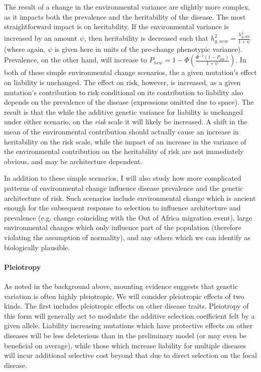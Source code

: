 \documentclass[11pt]{article}
\begin{document}
The result of a change in the environmental variance are slightly more complex, as it impacts both the prevalence and the heritability of the disease. The most straightforward impact is on heritability. If the environmental variance is increased by an amount $\psi$, then heritability is decreased such that $h^2_{g,new} = \frac{h^2_{g,old}}{1+\psi}$ (where again, $\psi$ is given here in units of the pre-change phenotypic variance). Prevalence, on the other hand, will increase to $P_{new} = 1 - \Phi\left(\frac{\Phi^{-1}\left(1-P_{old}\right)}{1+\psi}\right)$.
In both of these simple environmental change scenarios, the a given mutation's effect on liability is unchanged. The effect on risk, however, is increased, as a given mutation's contribution to risk conditional on its contribution to liability also depends on the prevalence of the disease (expressions omitted due to space). The result is that the while the additive genetic variance for liability is unchanged under either scenario, on the \textit{risk} scale it will likely be increased. A shift in the mean of the environmental contribution should actually cause an increase in heritability on the risk scale, while the impact of an increase in the variance of the environmental contribution on the heritability of risk are not immediately obvious, and may be architecture dependent.

In addition to these simple scenarios, I will also study how more complicated patterns of environmental change influence disease prevalence and the genetic architecture of risk. Such scenarios include environmental change which is ancient enough for the subsequent response to selection to influence architecture and prevalence (e.g. change coinciding with the Out of Africa migration event), large environmental changes which only influence part of the population (therefore violating the assumption of normality), and any others which we can identify as biologically plausible.  

\paragraph{Pleiotropy}

As noted in the background above, mounting evidence suggests that genetic variation is often highly pleiotropic\cite{Pickrell:2016ko, Visscher:2016fp}. We will consider pleiotropic effects of two kinds. The first includes pleiotropic effects on other disease traits. Pleiotropy of this form will generally act to modulate the additive selection coefficient felt by a given allele. Liability increasing mutations which have protective effects on other diseases will be less deleterious than in the preliminary model (or may even be beneficial on average), while those which increase liability for multiple diseases will incur additional selective cost beyond that due to direct selection on the focal disease.
\end{document}
